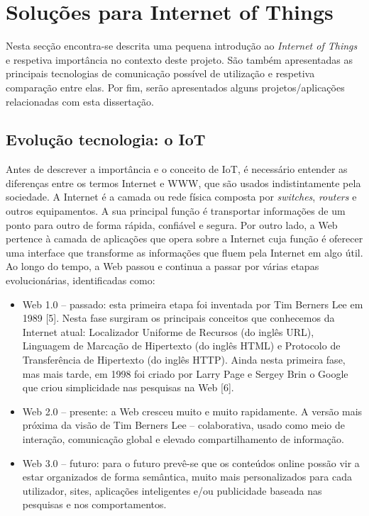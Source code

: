 
\chapter{Soluções para Internet of Things}

Nesta secção encontra-se descrita uma pequena introdução ao \textit{Internet of Things} e respetiva importância no contexto deste projeto. São também apresentadas as principais tecnologias de comunicação possível de utilização e respetiva comparação entre elas. Por fim, serão apresentados alguns projetos/aplicações relacionadas com esta dissertação.  





\section{Evolução tecnologia: o IoT}


Antes de descrever a importância e o conceito de \ac{IoT}, é necessário entender as diferenças entre os termos Internet e \ac{WWW}, que 	são usados indistintamente pela sociedade. A Internet é a camada ou rede física composta por \textit{switches}, \textit{routers} e outros equipamentos. A sua principal função é transportar informações de um ponto para outro de forma rápida, confiável e segura. Por outro lado, a Web pertence à camada de aplicações que opera sobre a Internet cuja função é oferecer uma interface que transforme as informações que fluem pela Internet em algo útil. Ao longo do tempo, a Web passou e continua a passar por várias etapas evolucionárias, identificadas como:

\begin{itemize}
	\item Web 1.0 – passado: esta primeira etapa foi inventada por Tim Berners Lee em 1989 [5]. Nesta fase surgiram os principais conceitos que conhecemos da Internet atual: Localizador Uniforme de Recursos (do inglês \ac{URL}), Linguagem de Marcação de Hipertexto (do inglês \ac{HTML}) e Protocolo de Transferência de Hipertexto (do inglês \ac{HTTP}). Ainda nesta primeira fase, mas mais tarde, em 1998 foi criado por Larry Page e Sergey Brin o Google que criou simplicidade nas pesquisas na Web [6]. 
	
	\item Web 2.0 – presente: a Web cresceu muito e muito rapidamente. A versão mais próxima da visão de Tim Berners Lee – colaborativa, usado como meio de interação, comunicação global e elevado compartilhamento de informação. 
	
	\item Web 3.0 – futuro: para o futuro prevê-se que os conteúdos online possão vir a estar organizados de forma semântica, muito mais personalizados para cada utilizador, sites, aplicações inteligentes e/ou publicidade baseada nas pesquisas e nos comportamentos.
\end{itemize}

